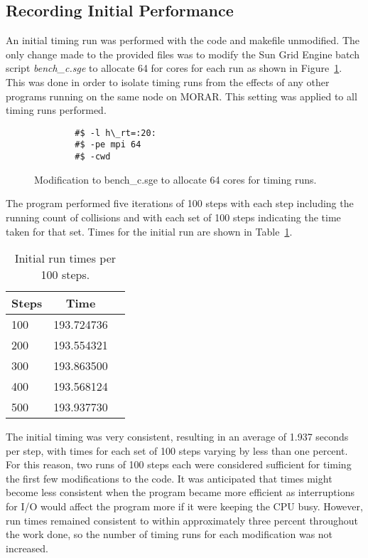 \documentclass[11pt, oneside]{article}   %
\begin{document}
\subsection{Recording Initial Performance}
An initial timing run was performed with the code and makefile unmodified.
The only change made to the provided files was to modify the Sun Grid Engine batch script {\em bench\_c.sge} to allocate 64 for cores for each run as shown in Figure~\ref{fig:batchsge}.
This was done in order to isolate timing runs from the effects of any other programs running on the same node on MORAR.
This setting was applied to all timing runs performed.

\begin{figure}
	\begin{lstlisting}
		#$ -l h\_rt=:20:
		#$ -pe mpi 64
		#$ -cwd
	\end{lstlisting}
	\caption{Modification to bench\_c.sge to allocate 64 cores for timing runs.}
	\label{fig:batchsge}
\end{figure}

The program performed five iterations of 100 steps with each step including the running count of collisions and with each set of 100 steps indicating the time taken for that set.  Times for the initial run are shown in Table~\ref{table:InitialRunTimes}.

\begin{table}[h]
	\begin{center}
		\begin{tabular}{||l|c|l||}
			\hline
				{\bf Steps} & {\bf Time}\\
			\hline
				100  &  193.724736\\
				200  &  193.554321\\
				300  &  193.863500\\
				400  &  193.568124\\
				500  &  193.937730\\
			\hline
		\end{tabular}
	\end{center}
	\caption{Initial run times per 100 steps.}
	\label{table:InitialRunTimes}
\end{table}

The initial timing was very consistent, resulting in an average of 1.937 seconds per step, with times for each set of 100 steps varying by less than one percent.
For this reason, two runs of 100 steps each were considered sufficient for timing the first few modifications to the code.
It was anticipated that times might become less consistent when the program became more efficient as interruptions for I/O would affect the program more if it were keeping the CPU busy.
However, run times remained consistent to within approximately three percent throughout the work done, so the number of timing runs for each modification was not increased.
\end{document}
